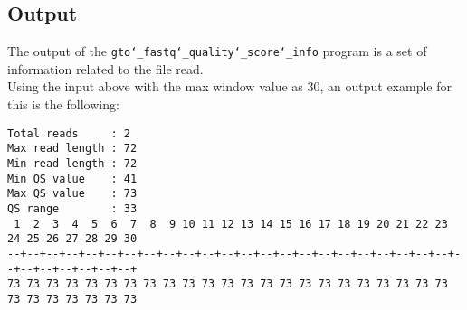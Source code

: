 \subsection*{Output}
The output of the \texttt{gto\char`_fastq\char`_quality\char`_score\char`_info} program is a set of information related to the file read. \\
Using the input above with the max window value as 30, an output example for this is the following:
\begin{lstlisting}
Total reads     : 2
Max read length : 72
Min read length : 72
Min QS value    : 41
Max QS value    : 73
QS range        : 33
 1  2  3  4  5  6  7  8  9 10 11 12 13 14 15 16 17 18 19 20 21 22 23 24 25 26 27 28 29 30 
--+--+--+--+--+--+--+--+--+--+--+--+--+--+--+--+--+--+--+--+--+--+--+--+--+--+--+--+--+--+
73 73 73 73 73 73 73 73 73 73 73 73 73 73 73 73 73 73 73 73 73 73 73 73 73 73 73 73 73 73 
\end{lstlisting}